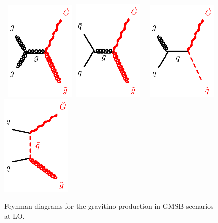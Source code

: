 \begin{figure}[!ht]
\begin{center}
\mbox{
\includegraphics[width=0.3\textwidth]{BeyondSM/Figures/Gravitino_ggg.eps}
\includegraphics[width=0.3\textwidth]{BeyondSM/Figures/Gravitino_qgq.eps}
}
\newline
\mbox{
\includegraphics[width=0.3\textwidth]{BeyondSM/Figures/Gravitino_qqg.eps}
\includegraphics[width=0.3\textwidth]{BeyondSM/Figures/Gravitino_qsqq.eps}
}
\end{center}
\caption{Feynman diagrams for the gravitino production in GMSB scenarios at LO.}
\label{fig:DiagramsGravitinoGMSB}
\end{figure}

